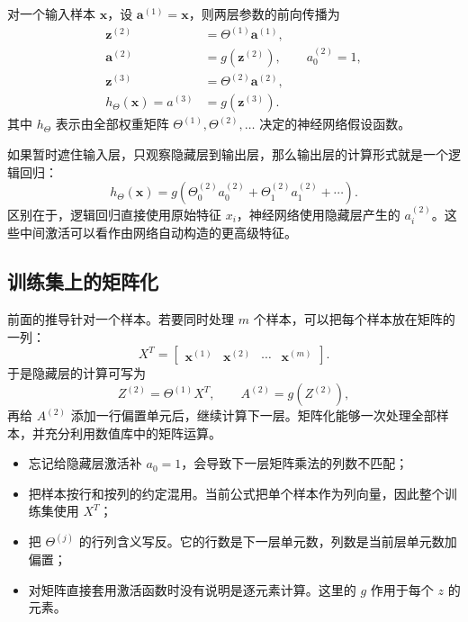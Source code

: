\documentclass[12pt,a4paper]{ctexart}
\begin{document}
\begin{keybox}[两层网络的完整计算]
对一个输入样本 $\mathbf{x}$，设 $\mathbf{a}^{(1)}=\mathbf{x}$，则两层参数的前向传播为
\begin{align*}
  \mathbf{z}^{(2)}&=\Theta^{(1)}\mathbf{a}^{(1)},\\
  \mathbf{a}^{(2)}&=g\!\left(\mathbf{z}^{(2)}\right),\qquad a_0^{(2)}=1,\\
  \mathbf{z}^{(3)}&=\Theta^{(2)}\mathbf{a}^{(2)},\\
  h_{\Theta}(\mathbf{x})=a^{(3)}&=g\!\left(\mathbf{z}^{(3)}\right).
\end{align*}
其中 $h_{\Theta}$ 表示由全部权重矩阵 $\Theta^{(1)},\Theta^{(2)},\ldots$ 决定的神经网络假设函数。
\end{keybox}

\begin{examplebox}[神经网络像多层逻辑回归]
如果暂时遮住输入层，只观察隐藏层到输出层，那么输出层的计算形式就是一个逻辑回归：
\[
  h_{\Theta}(\mathbf{x})
  =g\!\left(\Theta_0^{(2)}a_0^{(2)}+\Theta_1^{(2)}a_1^{(2)}+\cdots\right).
\]
区别在于，逻辑回归直接使用原始特征 $x_i$，神经网络使用隐藏层产生的 $a_i^{(2)}$。这些中间激活可以看作由网络自动构造的更高级特征。
\end{examplebox}

\subsection{训练集上的矩阵化}

\begin{definitionbox}[按列组织样本]
前面的推导针对一个样本。若要同时处理 $m$ 个样本，可以把每个样本放在矩阵的一列：
\[
  X^T=\begin{bmatrix}
    \mathbf{x}^{(1)}&\mathbf{x}^{(2)}&\cdots&\mathbf{x}^{(m)}
  \end{bmatrix}.
\]
于是隐藏层的计算可写为
\[
  Z^{(2)}=\Theta^{(1)}X^T,
  \qquad
  A^{(2)}=g\!\left(Z^{(2)}\right),
\]
再给 $A^{(2)}$ 添加一行偏置单元后，继续计算下一层。矩阵化能够一次处理全部样本，并充分利用数值库中的矩阵运算。
\end{definitionbox}

\begin{mistakebox}[维度与偏置单元]
\begin{itemize}
  \item 忘记给隐藏层激活补 $a_0=1$，会导致下一层矩阵乘法的列数不匹配；
  \item 把样本按行和按列的约定混用。当前公式把单个样本作为列向量，因此整个训练集使用 $X^T$；
  \item 把 $\Theta^{(j)}$ 的行列含义写反。它的行数是下一层单元数，列数是当前层单元数加偏置；
  \item 对矩阵直接套用激活函数时没有说明是逐元素计算。这里的 $g$ 作用于每个 $z$ 的元素。
\end{itemize}
\end{mistakebox}
\end{document}
